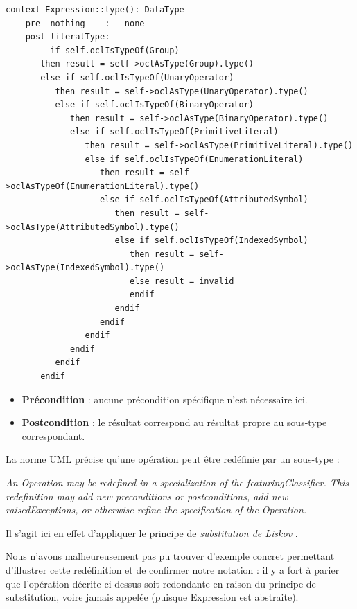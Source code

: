 \documentclass[oneside,a4paper]{book}
\begin{document}
\begin{minipage}{\linewidth}
    \begin{lstlisting}
context Expression::type(): DataType
    pre  nothing    : --none
    post literalType:
         if self.oclIsTypeOf(Group) 
       then result = self->oclAsType(Group).type()
       else if self.oclIsTypeOf(UnaryOperator) 
          then result = self->oclAsType(UnaryOperator).type()
          else if self.oclIsTypeOf(BinaryOperator)
             then result = self->oclAsType(BinaryOperator).type()
             else if self.oclIsTypeOf(PrimitiveLiteral) 
                then result = self->oclAsType(PrimitiveLiteral).type()
                else if self.oclIsTypeOf(EnumerationLiteral)
                   then result = self->oclAsTypeOf(EnumerationLiteral).type()
                   else if self.oclIsTypeOf(AttributedSymbol)
                      then result = self->oclAsType(AttributedSymbol).type()
                      else if self.oclIsTypeOf(IndexedSymbol)
                         then result = self->oclAsType(IndexedSymbol).type()
                         else result = invalid
                         endif
                      endif
                   endif
                endif
             endif 
          endif
       endif
    \end{lstlisting}
\end{minipage}

\begin{itemize}
    \item \textbf{Précondition} : aucune précondition spécifique n'est nécessaire ici.
    \item \textbf{Postcondition} : le résultat correspond au résultat propre au sous-type correspondant.
\end{itemize}

\begin{tcolorbox}
    La norme UML précise qu'une opération peut être redéfinie par un sous-type :\newline
    
\textit{An Operation may be redefined in a specialization of the featuringClassifier. This redefinition may add new preconditions or postconditions, add new raisedExceptions, or otherwise refine the specification of the Operation.} \cite[p.~117]{uml251spec2017} 

Il s'agit ici en effet d'appliquer le principe de \textit{substitution de Liskov} \cite{liskov2000}.
\newline

    Nous n'avons malheureusement pas pu trouver d'exemple concret permettant d'illustrer cette redéfinition et de confirmer notre notation : il y a fort à parier que l'opération décrite ci-dessus soit redondante en raison du principe de substitution, voire jamais appelée (puisque Expression est abstraite).
\end{tcolorbox}
\end{document}

